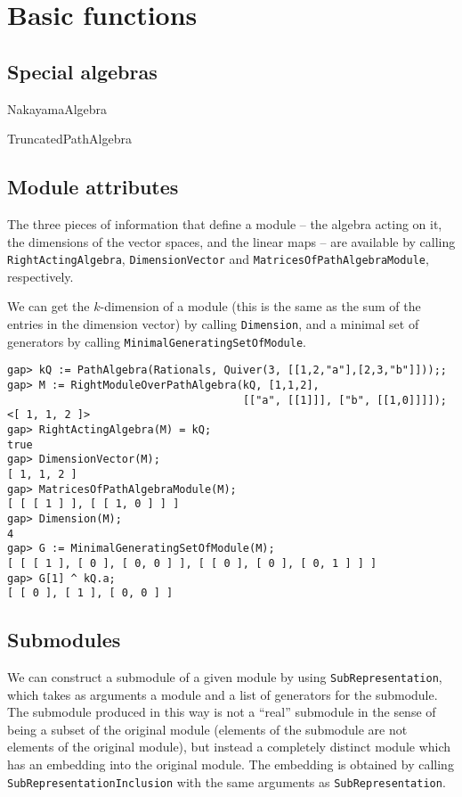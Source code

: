 \documentclass{amsart}
\theoremstyle{definition}
\theoremstyle{theoretic}
\begin{document}
\section{Basic functions}

\subsection{Special algebras}

NakayamaAlgebra

TruncatedPathAlgebra

\subsection{Module attributes}

The three pieces of information that define a module -- the algebra
acting on it, the dimensions of the vector spaces, and the linear maps
-- are available by calling \texttt{RightActingAlgebra},
\texttt{DimensionVector} and \texttt{MatricesOfPathAlgebraModule},
respectively.

We can get the $k$-dimension of a module (this is the same as the sum
of the entries in the dimension vector) by calling \texttt{Dimension},
and a minimal set of generators by calling
\texttt{MinimalGeneratingSetOfModule}.

\begin{verbatim}
gap> kQ := PathAlgebra(Rationals, Quiver(3, [[1,2,"a"],[2,3,"b"]]));;
gap> M := RightModuleOverPathAlgebra(kQ, [1,1,2],
                                     [["a", [[1]]], ["b", [[1,0]]]]);
<[ 1, 1, 2 ]>
gap> RightActingAlgebra(M) = kQ;
true
gap> DimensionVector(M);
[ 1, 1, 2 ]
gap> MatricesOfPathAlgebraModule(M);
[ [ [ 1 ] ], [ [ 1, 0 ] ] ]
gap> Dimension(M);
4
gap> G := MinimalGeneratingSetOfModule(M);
[ [ [ 1 ], [ 0 ], [ 0, 0 ] ], [ [ 0 ], [ 0 ], [ 0, 1 ] ] ]
gap> G[1] ^ kQ.a;
[ [ 0 ], [ 1 ], [ 0, 0 ] ]
\end{verbatim}

\subsection{Submodules}
\label{sec:submodules}

We can construct a submodule of a given module by using
\texttt{SubRepresentation}, which takes as arguments a module and a
list of generators for the submodule.  The submodule produced in this
way is not a ``real'' submodule in the sense of being a subset of the
original module (elements of the submodule are not elements of the
original module), but instead a completely distinct module which has
an embedding into the original module.  The embedding is obtained by
calling \texttt{SubRepresentationInclusion} with the same arguments as
\texttt{SubRepresentation}.
\end{document}

